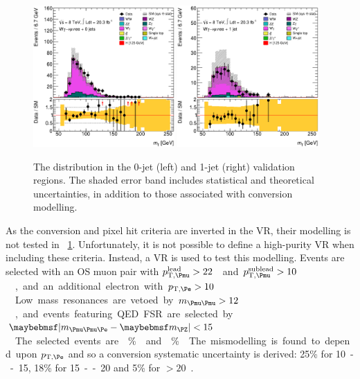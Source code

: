 \begin{figure}[t]
	\includegraphics[width=0.48\textwidth]{tex/backgrounds/Wgamma/CutTopoDPhill_0jet_MT_TrackHWW_Clj_mh125_lin}
	\hfill
	\includegraphics[width=0.48\textwidth]{tex/backgrounds/Wgamma/CutTopoDPhill_1jet_MT_TrackHWW_Clj_mh125_lin}
	\caption{The \mt distribution in the 0-jet (left) and 1-jet (right) \Wgamma validation 
	regions. The shaded error band includes statistical and theoretical uncertainties, in 
	addition to those associated with conversion modelling.}
	\label{fig:wgamma:vr}
\end{figure}

As the conversion and pixel hit criteria are inverted in the VR, their modelling is not 
tested in \Figure~\ref{fig:wgamma:vr}. Unfortunately, it is not possible to define a 
high-purity \Wgamma VR when including these criteria. Instead, 
a \HepProcess{\Zgamma \HepTo \Pmu\Pmu\Pphoton} VR is used to test this modelling. 
Events are selected with an OS muon pair with \unit{$p_{\text{T,\Pmu}}^{\text{lead}} > 
22$}{\GeV} and \unit{$p_{\text{T,\Pmu}}^{\text{sublead}} > 10$}{\GeV}, and an additional 
electron with \unit{$p_{\text{T,\Pe}} > 10$}{\GeV}. Low mass resonances are vetoed by 
\unit{$m_{\HepProcess{\Pmu\Pmu}} > 12$}{\GeV}, and events featuring QED FSR are selected by 
\unit{$\mods{m_{\HepProcess{\Pmu\Pmu\Pe}} - \mZ} < 15$}{\GeV}. The selected events are 
\% \Zgamma and \% \Zgstar. The mismodelling is found to depend upon 
$p_{\text{T,\Pe}}$ and so a conversion systematic uncertainty is derived: 25\% for 
\unit{10 -- 15}{\GeV}, 18\% for \unit{15 -- 20}{\GeV} and 5\% for \unit{$>\!20$}{\GeV}.



